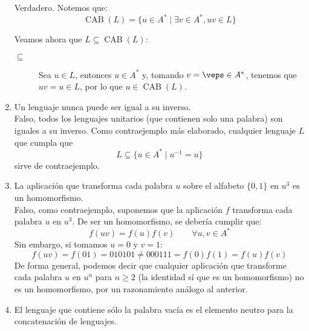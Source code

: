 \begin{enumerate}
        Verdadero. Notemos que:
        \begin{equation*}
            \operatorname{CAB}(L) = \{u\in A^\ast \mid \exists v\in A^\ast, uv\in L\}
        \end{equation*}

        Veamos ahora que $L\subseteq \operatorname{CAB}(L)$:
        \begin{description}
            \item[$\subseteq$] Sea $u\in L$, entonces $u\in A^\ast$ y, tomando $v=\veps\in A^\ast$, tenemos que $uv = u\in L$, por lo que $u\in \operatorname{CAB}(L)$.
        \end{description}
    
    \item Un lenguaje nunca puede ser igual a su inverso.\\

        Falso, todos los lenguajes unitarios (que contienen solo una palabra) son iguales a su inverso. Como contraejemplo más elaborado, cualquier lenguaje $L$ que cumpla que
        \begin{equation*}
            L \subseteq \{u\in A^\ast \mid u^{-1} = u\}
        \end{equation*}
        sirve de contraejemplo.
    \item La aplicación que transforma cada palabra $u$ sobre el alfabeto $\{0,1\}$ en $u^3$ es un homomorfismo.\\

        Falso, como contraejemplo, suponemos que la aplicación $f$ transforma cada palabra $u$ en $u^3$. De ser un homomorfismo, se debería cumplir que:
        \begin{equation*}
            f(uv) = f(u)f(v) \qquad \forall u,v\in A^\ast
        \end{equation*}
        Sin embargo, si tomamos $u = 0$ y $v = 1$:
        \begin{equation*}
            f(uv) = f(01) = 010101 \neq 000111 = f(0)f(1) = f(u)f(v)
        \end{equation*}
        De forma general, podemos decir que cualquier aplicación que transforme cada palabra $u$ en $u^n$ para $n \geq 2$ (la identidad sí que es un homomorfismo) no es un homomorfismo, por un razonamiento análogo al anterior.
    \item El lenguaje que contiene sólo la palabra vacía es el elemento neutro para la concatenación de lenguajes.\\


\end{enumerate}
